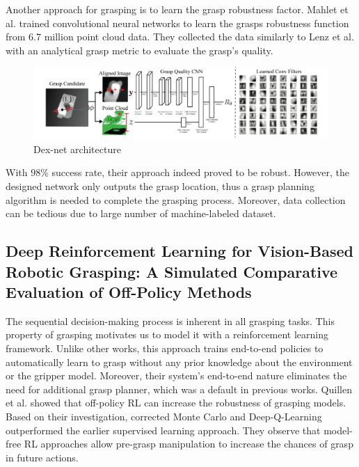 Another approach for grasping is to learn the grasp robustness factor. Mahlet et al.  trained convolutional neural networks to learn the grasps robustness function from 6.7 million point cloud data. They collected the data similarly to Lenz et al. with an analytical grasp metric to evaluate the grasp's quality. 

\begin{figure}[htbp]
    \centering
    \includegraphics[width=1.\textwidth]{figures/dexnet}
    \caption{Dex-net architecture \cite{Lenz2013}}
    \label{fig:dexnet}
\end{figure}

With \(98\%\) success rate, their approach indeed proved to be robust. However, the designed network only outputs the grasp location, thus a grasp planning algorithm is needed to complete the grasping process. Moreover, data collection can be tedious due to large number of machine-labeled dataset.


\subsection{Deep Reinforcement Learning for Vision-Based Robotic Grasping: A Simulated Comparative Evaluation of Off-Policy Methods}

The sequential decision-making process is inherent in all grasping tasks. This property of grasping motivates us to model it with a reinforcement learning framework. Unlike other works, this approach trains end-to-end policies to automatically learn to grasp without any prior knowledge about the environment or the gripper model. Moreover, their system's end-to-end nature eliminates the need for additional grasp planner, which was a default in previous works. 
Quillen et al. showed that off-policy RL can increase the robustness of grasping models. Based on their investigation, corrected Monte Carlo and Deep-Q-Learning outperformed the earlier supervised learning approach. They observe that model-free RL approaches allow pre-grasp manipulation to increase the chances of grasp in future actions. 


